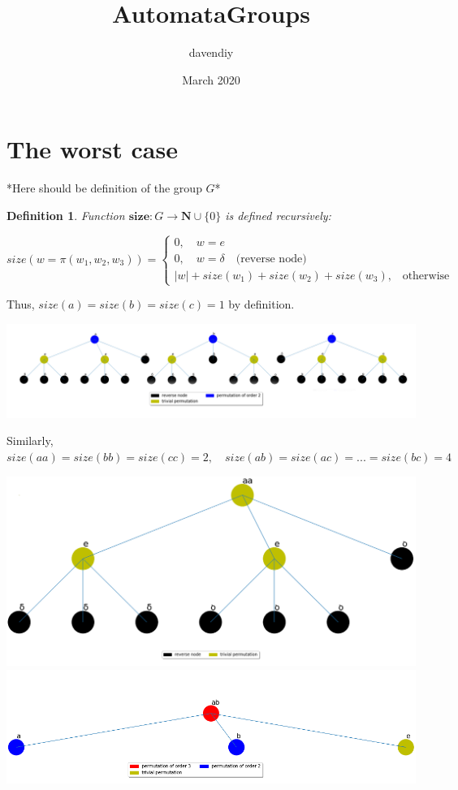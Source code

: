\documentclass{article}
\title{AutomataGroups}
\author{davendiy }
\date{March 2020}
\newtheorem{definition}{Definition}[section]
\begin{document}

\section{The worst case}

*Here should be definition of the group $G$*

\theoremstyle{definition}
\begin{definition}
	 Function $\textbf{size} : G \rightarrow \mathbf{N} \cup \{0\}$ is defined recursively:
	
	\begin{equation} 
	size(w = \pi (w_1, w_2, w_3)) =
	\begin{cases}
	0, \quad  w = e \\
	0, \quad  w = \delta \quad \text{(reverse node)} \\
	|w| + size(w_1) + size(w_2) + size(w_3)\text{,} \quad \text{otherwise}
	\end{cases}
	\end{equation}
\end{definition}



Thus, $size(a) = size(b) = size(c) = 1$ by definition.

\includegraphics[scale=0.13]{../graphs/a_b_c.png}


Similarly, $size(aa) = size(bb) = size(cc) = 2, \quad size(ab) = size(ac) = ... = size(bc) = 4$

\includegraphics[scale=0.25]{../graphs/aa.png}
\includegraphics[scale=0.25]{../graphs/ab.png}
\end{document}
